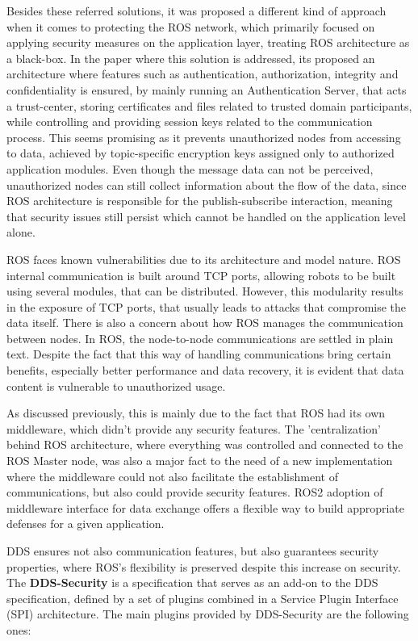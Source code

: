 Besides these referred solutions, it was proposed a different kind of approach when it comes to protecting the ROS network, which primarily focused on applying security measures on the application layer, treating ROS architecture as a black-box. In the paper where this solution is addressed, its proposed an architecture where features such as authentication, authorization, integrity and confidentiality is ensured, by mainly running an Authentication Server, that acts a trust-center, storing certificates and files related to trusted domain participants, while controlling and providing session keys related to the communication process. This seems promising as it prevents unauthorized nodes from accessing to data, achieved by topic-specific encryption keys assigned only to authorized application modules. Even though the message data can not be perceived, unauthorized nodes can still collect information about the flow of the data, since ROS architecture is responsible for the publish-subscribe interaction, meaning that security issues still persist which cannot be handled on the application level alone.  

ROS faces known vulnerabilities due to its architecture and model nature. ROS internal communication is built around TCP ports, allowing robots to be built using several modules, that can be distributed. However, this modularity results in the exposure of TCP ports, that usually leads to attacks that compromise the data itself.
There is also a concern about how ROS manages the communication between nodes. In ROS, the node-to-node communications are settled in plain text. Despite the fact that this way of handling communications bring certain benefits, especially better performance and data recovery, it is evident that data content is vulnerable to unauthorized usage.

As discussed previously, this is mainly due to the fact that ROS had its own middleware, which didn't provide any security features. The 'centralization' behind ROS architecture, where everything was controlled and connected to the ROS Master node, was also a major fact to the need of a new implementation where the middleware could not also facilitate the establishment of communications, but also could provide security features. ROS2 adoption of middleware interface for data exchange offers a flexible way to build appropriate defenses for a given application.

DDS ensures not also communication features, but also guarantees security properties, where ROS's flexibility is preserved despite this increase on security. The \textbf{DDS-Security} is a specification that serves as an add-on to the DDS specification, defined by a set of plugins combined in a Service Plugin Interface (SPI) architecture. The main plugins provided by DDS-Security are the following ones:
            
